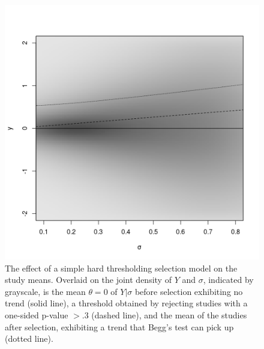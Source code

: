 \documentclass[12pt]{article}
\newcommand{\E}{E}
\newcommand{\biasratio}{b}%
\newcommand{\y}{Y}
\begin{document}
\begin{figure}
  \includegraphics[width=\linewidth]{selection.png}
  \caption{  The effect of a simple hard thresholding selection model on the
  study means. Overlaid on the joint density of $\y$ and $\sigma$, indicated by grayscale, is the mean $\theta=0$ of $\y|\sigma$
  before selection exhibiting no
  trend (solid line), a threshold obtained by rejecting studies with a one-sided p-value
  $>.3$ (dashed line), and the mean of the studies
  after selection, exhibiting a trend that Begg's test can pick up (dotted line).
}
  \label{fig:selection}
\end{figure}
  
  
\end{document}
